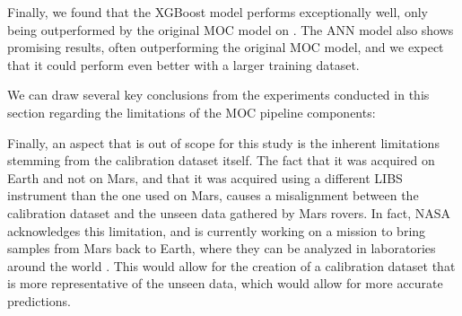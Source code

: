 Finally, we found that the XGBoost model performs exceptionally well, only being outperformed by the original MOC model on .
The ANN model also shows promising results, often outperforming the original MOC model, and we expect that it could perform even better with a larger training dataset.

We can draw several key conclusions from the experiments conducted in this section regarding the limitations of the MOC pipeline components:


Finally, an aspect that is out of scope for this study is the inherent limitations stemming from the calibration dataset itself.
The fact that it was acquired on Earth and not on Mars, and that it was acquired using a different LIBS instrument than the one used on Mars, causes a misalignment between the calibration dataset and the unseen data gathered by Mars rovers.
In fact, NASA acknowledges this limitation, and is currently working on a mission to bring samples from Mars back to Earth, where they can be analyzed in laboratories around the world \cite{mars-sample-return}.
This would allow for the creation of a calibration dataset that is more representative of the unseen data, which would allow for more accurate predictions.
